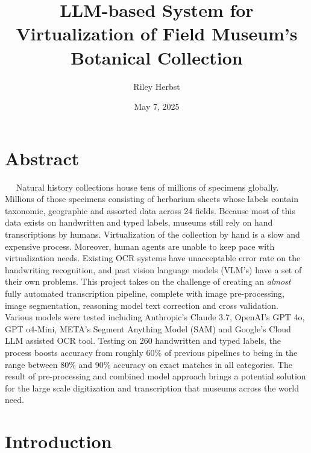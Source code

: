 \documentclass{article}
\title{LLM-based System for Virtualization of Field Museum's Botanical Collection}
\author{Riley Herbst}
\date{May 7, 2025}
\begin{document}
\maketitle

\section*{Abstract}
$\quad$ Natural history collections house tens of millions of specimens globally. Millions of those specimens consisting of herbarium sheets whose labels contain taxonomic, geographic and assorted data across 24 fields. Because most of this data exists on handwritten and typed labels, museums still rely on hand transcriptions by humans. Virtualization of the collection by hand is a slow and expensive process. Moreover, human agents are unable to keep pace with virtualization needs. Existing OCR systems have unacceptable error rate on the handwriting recognition, and past vision language models (VLM's) have a set of their own problems. This project takes on the challenge of creating an \textit{almost} fully automated transcription pipeline, complete with image pre-processing, image segmentation, reasoning model text correction and cross validation. Various models were tested including Anthropic's Claude 3.7, OpenAI's GPT 4o, GPT o4-Mini, META's Segment Anything Model (SAM) and Google's Cloud LLM assisted OCR tool. Testing on 260 handwritten and typed labels, the process boosts accuracy  from roughly 60\% of previous pipelines to being in the range between 80\% and 90\% accuracy on exact matches in all categories. The result of pre-processing and combined model approach brings a potential solution for the large scale digitization and transcription that museums across the world need.


\section{Introduction}
\end{document}
